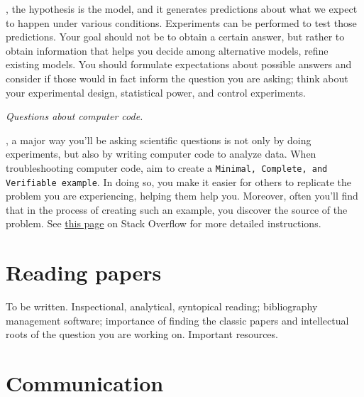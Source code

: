 \documentclass{tufte-book}
\newcommand{\doccls}[1]{\texttt{#1}}%
\begin{document}
, the hypothesis is the
model, and it generates predictions about what we expect to happen
under various conditions. Experiments can be performed to test those
predictions. Your goal should not be to obtain a certain answer, but
rather to obtain information that helps you decide among alternative
models, refine existing models. You should formulate expectations
about possible answers and consider if those would in fact inform the
question you are asking; think about your experimental design,
statistical power, and control experiments.

{\it Questions about computer code.} 

, a major way you'll be asking scientific
questions is not only by doing experiments, but also by writing
computer code to analyze data. When troubleshooting computer code, aim
to create a \doccls{Minimal, Complete, and Verifiable example}. In
doing so, you make it easier for others to replicate the problem you
are experiencing, helping them help you. Moreover, often you'll find
that in the process of creating such an example, you discover the
source of the problem. See
\href{https://stackoverflow.com/help/mcve}{this page} on Stack
Overflow for more detailed
instructions.


\section{Reading papers}

To be written. Inspectional, analytical, syntopical reading;
bibliography management software; importance of finding the classic
papers and intellectual roots of the question you are working
on. Important resources.

\section{Communication}
\end{document}
